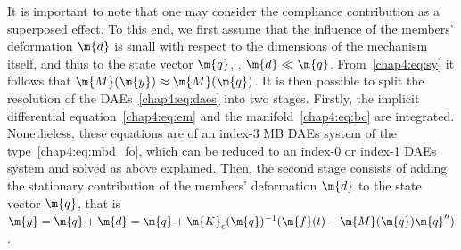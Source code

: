 It is important to note that one may consider the compliance contribution as a superposed effect. To this end, we first assume that the influence of the members' deformation $\m{d}$ is small with respect to the dimensions of the mechanism itself, and thus to the state vector $\m{q}$, \ie{}, $\m{d} \ll \m{q}$. From~\eqref{chap4:eq:sy} it follows that $\m{M}(\m{y}) \approx \m{M}(\m{q})$. It is then possible to split the resolution of the \acp{DAE}~\eqref{chap4:eq:daes} into two stages. Firstly, the implicit differential equation~\eqref{chap4:eq:em} and the manifold~\eqref{chap4:eq:bc} are integrated. Nonetheless, these equations are of an index-3 \ac{MB} \acp{DAE} system of the type~\eqref{chap4:eq:mbd_fo}, which can be reduced to an index-0 or index-1 \acp{DAE} system and solved as above explained. Then, the second stage consists of adding the stationary contribution of the members' deformation $\m{d}$ to the state vector $\m{q}$, that is $\m{y} = \m{q} + \m{d} = \m{q} + \m{K}_c(\m{q})^{-1} (\m{f}(t) - \m{M}(\m{q})\m{q}^{\prime\prime})$.

